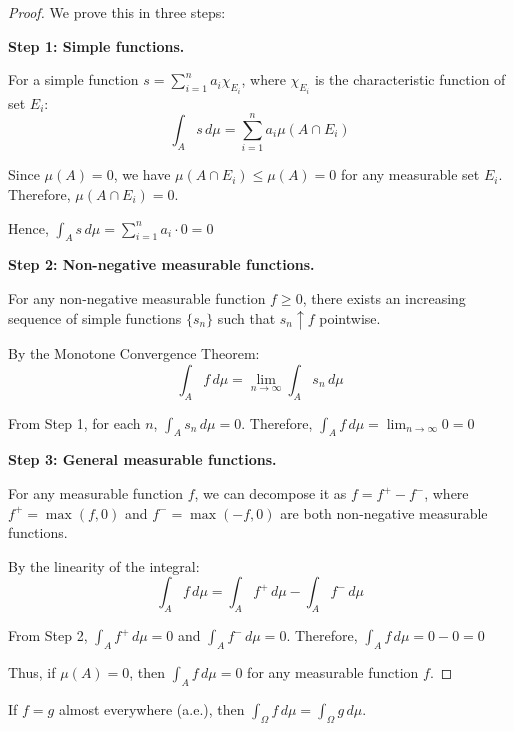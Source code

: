     \begin{proof}
    We prove this in three steps:
    
    \textbf{Step 1: Simple functions.}
    
    For a simple function $s = \sum_{i=1}^n a_i \chi_{E_i}$, where $\chi_{E_i}$ is the characteristic function of set $E_i$:
    $$\int_A s \, d\mu = \sum_{i=1}^n a_i \mu(A \cap E_i)$$
    
    Since $\mu(A) = 0$, we have $\mu(A \cap E_i) \leq \mu(A) = 0$ for any measurable set $E_i$. Therefore, $\mu(A \cap E_i) = 0$.
    
    Hence, $\int_A s \, d\mu = \sum_{i=1}^n a_i \cdot 0 = 0$
    
    \textbf{Step 2: Non-negative measurable functions.}
    
    For any non-negative measurable function $f \geq 0$, there exists an increasing sequence of simple functions $\{s_n\}$ such that $s_n \uparrow f$ pointwise.
    
    By the Monotone Convergence Theorem:
    $$\int_A f \, d\mu = \lim_{n \to \infty} \int_A s_n \, d\mu$$
    
    From Step 1, for each $n$, $\int_A s_n \, d\mu = 0$. Therefore, $\int_A f \, d\mu = \lim_{n \to \infty} 0 = 0$
    
    \textbf{Step 3: General measurable functions.}
    
    For any measurable function $f$, we can decompose it as $f = f^+ - f^-$, where $f^+ = \max(f, 0)$ and $f^- = \max(-f, 0)$ are both non-negative measurable functions.
    
    By the linearity of the integral:
    $$\int_A f \, d\mu = \int_A f^+ \, d\mu - \int_A f^- \, d\mu$$
    
    From Step 2, $\int_A f^+ \, d\mu = 0$ and $\int_A f^- \, d\mu = 0$. Therefore, $\int_A f \, d\mu = 0 - 0 = 0$
    
    Thus, if $\mu(A) = 0$, then $\int_A f \, d\mu = 0$ for any measurable function $f$.
    \end{proof}
    
    \begin{corollary}
    If $f = g$ almost everywhere (a.e.), then $\int_\Omega f \, d\mu = \int_\Omega g \, d\mu$.
    \end{corollary}
    
